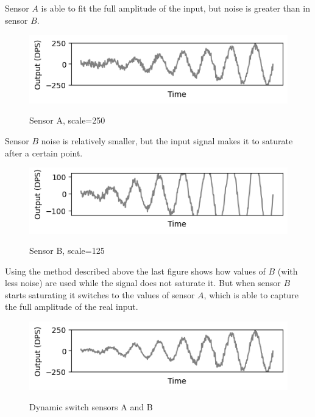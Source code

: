 \documentclass[10pt, twocolumn, a4paper]{article}
\begin{document}
        Sensor $A$ is able to fit the full amplitude of the input, but noise is greater than in sensor $B$.
        \begin{figure}[H]
            \caption{Sensor A, scale=250}
            \includegraphics[width=\linewidth]{figure_scale_2.png}
            \label{fig_scale_2}
        \end{figure}
        \vspace{-8mm}

        Sensor $B$ noise is relatively smaller, but the input signal makes it to saturate after a certain point.
        \begin{figure}[H]
            \caption{Sensor B, scale=125}
            \includegraphics[width=\linewidth]{figure_scale_3.png}
            \label{fig_scale_3}
        \end{figure}
        \vspace{-8mm}

        Using the method described above the last figure shows how values of $B$ (with less noise) are used while the signal does not saturate it. But when sensor $B$ starts saturating it switches to the values of sensor $A$, which is able to capture the full amplitude of the real input.
        \begin{figure}[H]
            \caption{Dynamic switch sensors A and B}
            \includegraphics[width=\linewidth]{figure_scale_4.png}
            \label{fig_scale_4}
        \end{figure}
        \vspace{-8mm}
\end{document}
